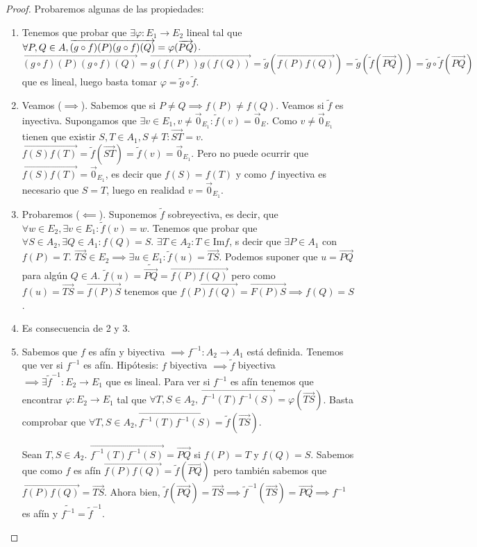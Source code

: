 \documentclass[14pt]{book}
\begin{document}
\begin{proof}
	Probaremos algunas de las propiedades:
	\begin{enumerate}
		\item Tenemos que probar que $\exists \varphi : E_1 \to E_2$ lineal tal que $\forall P, Q \in A,\\ \overrightarrow{(g \circ f)(P)(g \circ f)(Q)} = \varphi (\overrightarrow{PQ})$. $\overrightarrow{(g \circ f)(P)(g \circ f)(Q)} = \overrightarrow{g(f(P)) g(f(Q))} = \tilde{g}(\overrightarrow{f(P)f(Q)}) = \tilde{g}(\tilde{f}(\overrightarrow{PQ})) = \tilde{g} \circ \tilde{f}(\overrightarrow{PQ})$ que es lineal, luego basta tomar $\varphi = \tilde{g} \circ \tilde{f}$.
		\item Veamos ($\implies$). Sabemos que si $P ≠ Q \implies f(P) ≠ f(Q)$. Veamos si $\tilde{f}$ es inyectiva. Supongamos que $\exists v \in E_1, v≠\vec{0}_{E_1} : \tilde{f} (v) = \vec{0}_E$. Como $v ≠ \vec{0}_{E_1}$ tienen que existir $S, T \in A_1, S ≠ T : \overrightarrow{ST} = v$. $\overrightarrow{f(S)f(T)} = \tilde{f}(\overrightarrow{ST}) = \tilde{f}(v) = \vec{0}_{E_1}$. Pero no puede ocurrir que $\overrightarrow{f(S)f(T)} = \vec{0}_{E_1}$, es decir que $f(S) = f(T)$ y como $f$ inyectiva es necesario que $S = T$, luego en realidad $v = \vec{0}_{E_1}$.
		\item Probaremos ($\impliedby$). Suponemos $\tilde{f}$ sobreyectiva, es decir, que $\forall w \in E_2, \exists v \in E_1 : \tilde{f}(v) = w$. Tenemos que probar que $\forall S \in A_2, \exists Q \in A_1 : f(Q) = S$. $\exists T \in A_2 : T \in \text{Im} f$, s decir que $\exists P \in A_1$ con $f(P) = T$. $\overrightarrow{TS} \in E_2 \implies \exists u \in E_1 : \tilde{f}(u) = \overrightarrow{TS}$. Podemos suponer que $u = \overrightarrow{PQ}$ para algún $Q \in A$. $\tilde{f}(u) = \tilde{\overrightarrow{PQ}} = \overrightarrow{f(P)f(Q)}$ pero como $f(u) = \overrightarrow{TS} = \overrightarrow{f(P)S}$ tenemos que $\overrightarrow{f(P) f(Q)} = \overrightarrow{F(P) S} \implies f(Q) = S$.
		\item Es consecuencia de 2 y 3.
		\item Sabemos que $f$ es afín y biyectiva $\implies f^{-1} : A_2 \to A_1$ está definida. Tenemos que ver si $f^{-1}$ es afín. Hipótesis: $f$ biyectiva $\implies \tilde{f}$ biyectiva $\implies \exists \tilde{f}^{-1} : E_2 \to E_1$ que es lineal. Para ver si $f^{-1}$ es afín tenemos que encontrar $\varphi : E_2 \to E_1$ tal que $\forall T, S \in A_2,\ \overrightarrow{f^{-1}(T)f^{-1}(S)} = \varphi(\overrightarrow{TS})$. Basta comprobar que $\forall T, S \in A_2, \overrightarrow{f^{-1}(T)f^{-1}(S)} = \tilde{f}(\overrightarrow{TS})$.
		
		Sean $T, S \in A_2$. $\overrightarrow{f^{-1}(T)f^{-1}(S)} = \overrightarrow{PQ}$ si $f(P) = T$ y $f(Q) = S$. Sabemos que como $f$ es afín $\overrightarrow{f(P) f(Q)} = \tilde{f}(\overrightarrow{PQ})$ pero también sabemos que $\overrightarrow{f(P) f(Q)} = \overrightarrow{TS}$. Ahora bien, $\tilde{f}(\overrightarrow{PQ}) = \overrightarrow{TS} \implies \tilde{f}^{-1} (\overrightarrow{TS}) = \overrightarrow{PQ} \implies f^{-1}$ es afín y $\widetilde{f^{-1}} = \tilde{f}^{-1}$.
	\end{enumerate}
\end{proof}
\end{document}
